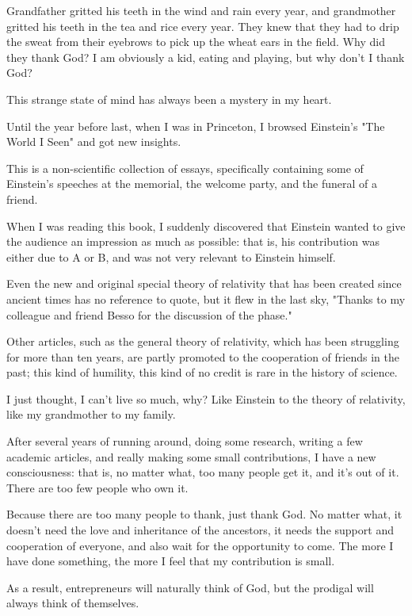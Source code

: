 \begin{acknowledgement*}
Grandfather gritted his teeth in the wind and rain every year, and grandmother gritted his teeth in the tea and rice every year. They knew that they had to drip the sweat from their eyebrows to pick up the wheat ears in the field. Why did they thank God? I am obviously a kid, eating and playing, but why don't I thank God?

This strange state of mind has always been a mystery in my heart.

Until the year before last, when I was in Princeton, I browsed Einstein's "The World I Seen" and got new insights.

This is a non-scientific collection of essays, specifically containing some of Einstein's speeches at the memorial, the welcome party, and the funeral of a friend.

When I was reading this book, I suddenly discovered that Einstein wanted to give the audience an impression as much as possible: that is, his contribution was either due to A or B, and was not very relevant to Einstein himself.

Even the new and original special theory of relativity that has been created since ancient times has no reference to quote, but it flew in the last sky, "Thanks to my colleague and friend Besso for the discussion of the phase."

Other articles, such as the general theory of relativity, which has been struggling for more than ten years, are partly promoted to the cooperation of friends in the past; this kind of humility, this kind of no credit is rare in the history of science.

I just thought, I can't live so much, why? Like Einstein to the theory of relativity, like my grandmother to my family.

After several years of running around, doing some research, writing a few academic articles, and really making some small contributions, I have a new consciousness: that is, no matter what, too many people get it, and it’s out of it. There are too few people who own it.

Because there are too many people to thank, just thank God. No matter what, it doesn't need the love and inheritance of the ancestors, it needs the support and cooperation of everyone, and also wait for the opportunity to come. The more I have done something, the more I feel that my contribution is small.

As a result, entrepreneurs will naturally think of God, but the prodigal will always think of themselves.


\end{acknowledgement*}
